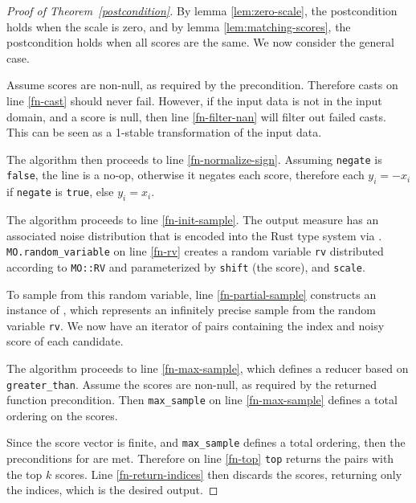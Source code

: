 \documentclass{article}
\begin{document}
\begin{proof}[Proof of Theorem~\ref{postcondition}]
    By lemma \ref{lem:zero-scale}, the postcondition holds when the scale is zero,
    and by lemma \ref{lem:matching-scores}, the postcondition holds when all scores are the same.
    We now consider the general case.

    Assume scores are non-null, as required by the precondition.
    Therefore casts on line \ref{fn-cast} should never fail.
    However, if the input data is not in the input domain, and a score is null,
    then line \ref{fn-filter-nan} will filter out failed casts.
    This can be seen as a 1-stable transformation of the input data.

    The algorithm then proceeds to line \ref{fn-normalize-sign}.
    Assuming \texttt{negate} is \texttt{false}, the line is a no-op, otherwise it negates each score,
    therefore each $y_i = -x_i$ if \texttt{negate} is \texttt{true}, else $y_i = x_i$.

    The algorithm proceeds to line \ref{fn-init-sample}.
    The output measure has an associated noise distribution that is encoded into the Rust type system via
    .
    \texttt{MO.random\_variable} on line \ref{fn-rv} creates a random variable \texttt{rv} 
    distributed according to \texttt{MO::RV} and parameterized by \texttt{shift} (the score), and \texttt{scale}.

    To sample from this random variable, line \ref{fn-partial-sample} constructs an instance of 
    , 
    which represents an infinitely precise sample from the random variable \texttt{rv}.
    We now have an iterator of pairs containing the index and noisy score of each candidate.

    The algorithm proceeds to line \ref{fn-max-sample},
    which defines a reducer based on \texttt{greater\_than}.
    Assume the scores are non-null, as required by the returned function precondition.
    Then \texttt{max\_sample} on line \ref{fn-max-sample} defines a total ordering on the scores.

    Since the score vector is finite, and \texttt{max\_sample} defines a total ordering,
    then the preconditions for  are met.
    Therefore on line \ref{fn-top} \texttt{top} returns the pairs with the top $k$ scores.
    Line \ref{fn-return-indices} then discards the scores, returning only the indices,
    which is the desired output.


\end{proof}
\end{document}
